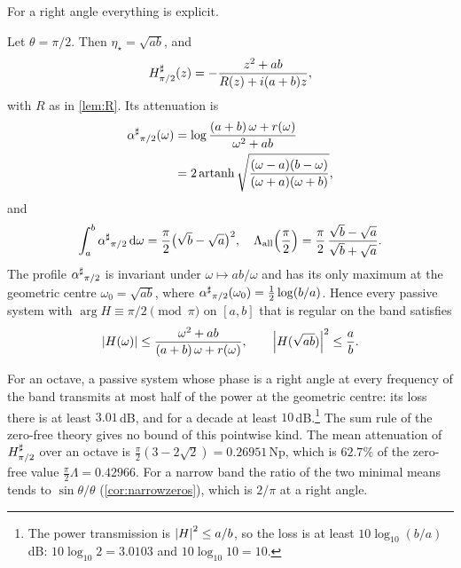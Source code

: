 For a right angle everything is explicit.

\begin{theorem}\label{thm:rightangle}
Let $\theta=\pi/2$. Then $\eta_\star=\sqrt{ab}$, and
\begin{equation}\label{eq:Hright}
H^{\sharp}_{\pi/2}(z)=-\frac{z^2+ab}{R(z)+i(a+b)z},
\end{equation}
with $R$ as in \cref{lem:R}. Its attenuation is
\begin{equation}\label{eq:alpharight}
\begin{aligned}
{\alpha^{\sharp}}_{\pi/2}(\omega)&=\log\frac{(a+b)\,\omega+r(\omega)}{\omega^2+ab}\\
&=2\operatorname{artanh}\sqrt{\frac{(\omega-a)(b-\omega)}{(\omega+a)(\omega+b)}} ,
\end{aligned}
\end{equation}
and
\begin{equation}\label{eq:lambdaright}
\int_a^b{\alpha^{\sharp}}_{\pi/2}\,\mathrm d\omega=\frac\pi2\big(\sqrt b-\sqrt a\big)^2,\quad
\Lambda_{\mathrm{all}}\Big(\frac\pi2\Big)=\frac\pi2\,\frac{\sqrt b-\sqrt a}{\sqrt b+\sqrt a}.
\end{equation}
The profile ${\alpha^{\sharp}}_{\pi/2}$ is invariant under $\omega\mapsto ab/\omega$ and has
its only maximum at the geometric centre $\omega_0=\sqrt{ab}$, where
${\alpha^{\sharp}}_{\pi/2}(\omega_0)=\frac12\log(b/a)$. Hence every passive system with
$\arg H\equiv\pi/2\pmod\pi$ on $[a,b]$ that is regular on the band satisfies
\begin{equation}\label{eq:threedb}
\left|H(\omega)\right|\le\frac{\omega^2+ab}{(a+b)\,\omega+r(\omega)},\qquad
\left|H(\sqrt{ab})\right|^2\le\frac ab .
\end{equation}
\end{theorem}

For an octave, a passive system whose phase is a right angle at every
frequency of the band transmits at most half of the power at the geometric
centre: its loss there is at least $3.01$\,dB, and for a decade at least
$10$\,dB.\footnote{The power transmission is $\left|H\right|^2\le a/b$, so the loss
is at least $10\log_{10}(b/a)$\,dB: $10\log_{10}2=3.0103$ and
$10\log_{10}10=10$.} The sum rule of the zero-free theory gives no bound of
this pointwise kind. The mean attenuation of
$H^{\sharp}_{\pi/2}$ over an octave is $\frac\pi2(3-2\sqrt2)=0.26951$\,Np, which is
$62.7\%$ of the zero-free value $\frac\pi2\Lambda=0.42966$. For a narrow band
the ratio of the two minimal means tends to $\sin\theta/\theta$
(\cref{cor:narrowzeros}), which is $2/\pi$ at a right angle.

